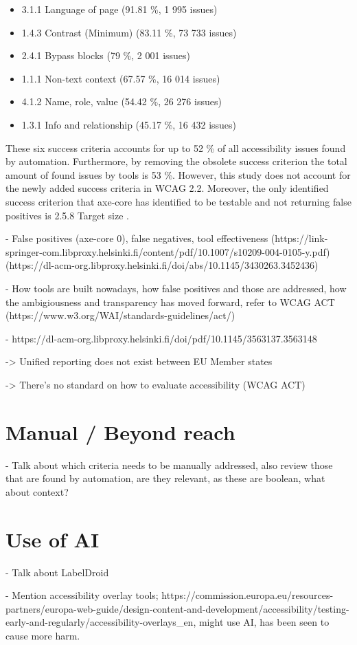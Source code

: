 \begin{itemize}
  \item 3.1.1 Language of page (91.81 \%, 1 995 issues)
  \item 1.4.3 Contrast (Minimum) (83.11 \%, 73 733 issues)
  \item 2.4.1 Bypass blocks (79 \%, 2 001 issues)
  \item 1.1.1 Non-text context (67.57 \%, 16 014 issues)
  \item 4.1.2 Name, role, value (54.42 \%, 26 276 issues)
  \item 1.3.1 Info and relationship (45.17 \%, 16 432 issues)
\end{itemize}

These six success criteria accounts for up to 52 \% of all accessibility issues found by automation. Furthermore, by removing the obsolete success criterion the total amount of found issues by tools is 53 \%. However, this study does not account for the newly added success criteria in WCAG 2.2. Moreover, the only identified success criterion that axe-core has identified to be testable and not returning false positives is 2.5.8 Target size \citep{dequeaxe4_5}.

- False positives (axe-core 0), false negatives, tool effectiveness (https://link-springer-com.libproxy.helsinki.fi/content/pdf/10.1007/s10209-004-0105-y.pdf)
(https://dl-acm-org.libproxy.helsinki.fi/doi/abs/10.1145/3430263.3452436)

- How tools are built nowadays, how false positives and those are addressed, how the ambigiousness and transparency has moved forward, refer to WCAG ACT (https://www.w3.org/WAI/standards-guidelines/act/)



- https://dl-acm-org.libproxy.helsinki.fi/doi/pdf/10.1145/3563137.3563148

-> Unified reporting does not exist between EU Member states

-> There's no standard on how to evaluate accessibility (WCAG ACT)


\section{Manual / Beyond reach}

- Talk about which criteria needs to be manually addressed, also review those that are found by automation, are they relevant, as these are boolean, what about context?

\section{Use of AI}

- Talk about LabelDroid

- Mention accessibility overlay tools; https://commission.europa.eu/resources-partners/europa-web-guide/design-content-and-development/accessibility/testing-early-and-regularly/accessibility-overlays_en, might use AI, has been seen to cause more harm.

